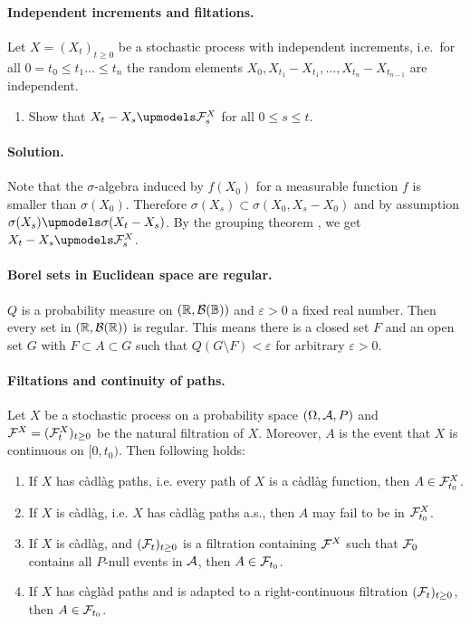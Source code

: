
\paragraph{Independent increments and filtations.} Let $X = (X_t)_{t\geq 0}$ be
a stochastic process with independent increments, i.e.\ for all $0=t_{0}\leq t_1
\dots \leq t_n$ the random elements $X_0, X_{t_1}-X_{t_1},\dots
,X_{t_n}-X_{t_{n-1}}$ are independent.
\begin{enumerate}
    \item Show that $X_t -X_s \upmodels \cF_{s}^{X}$ for all $0\leq s\leq t$. 
\end{enumerate}

\paragraph*{Solution.} Note that the $\sigma$-algebra induced by $f(X_0)$ for a
measurable function $f$ is smaller than $\sigma(X_0)$. Therefore $\sigma(X_s)
\subset \sigma(X_0, X_s-X_0)$ and by assumption $\sigma(X_s) \upmodels
\sigma(X_t-X_s)$. By the grouping theorem \cite[p. 51]{Kallenberg}, we get
$X_{t}-X_{s}\upmodels \cF_s^{X}$. 


\paragraph{Borel sets in Euclidean space are regular.} $Q$ is a probability
measure on $(\mathbb R, \mathcal B(\mathbb B))$ and $\varepsilon>0$ a fixed real number. Then
every set in $(\mathbb R, \mathcal B(\mathbb R))$ is regular. This means there is a closed set $F$
and an open set $G$ with $F\subset A \subset G$ such that $Q(G\setminus
F)<\varepsilon$ for arbitrary $\varepsilon>0$. 


\paragraph{Filtations and continuity of paths.} Let $X$ be a stochastic process
on a probability space $(\Omega, \mathcal A, P)$ and $\mathcal F^{X}=(\mathcal F^{X}_{t})_{t\geq 0}$
be the natural filtration of $X$. Moreover, $A$ is the event that $X$ is
continuous on $[0, t_0)$. Then following holds:
\begin{enumerate}
    \item If $X$ has c\`adl\`ag paths, i.e. every path of $X$ is a c\`adl\`ag
        function, then $A\in \mathcal F^{X}_{t_0}$. 

    \item If $X$ is c\`adl\`ag, i.e. $X$ has c\`adl\`ag paths a.s., then $A$
        may fail to be in $\mathcal F^{X}_{t_0}$.

    \item If $X$ is c\`adl\`ag, and $(\mathcal F_{t})_{t\geq 0}$ is a filtration
        containing $\mathcal F^{X}$ such that $\mathcal F_{0}$ contains all $P$-null events
        in $\mathcal A$, then $A\in \mathcal F_{t_0}$.

    \item If $X$ has c\`agl\`ad paths and is adapted to a right-continuous
        filtration $(\mathcal F_{t})_{t\geq 0}$, then $A\in \mathcal F_{t_{0}}$. 
\end{enumerate}


